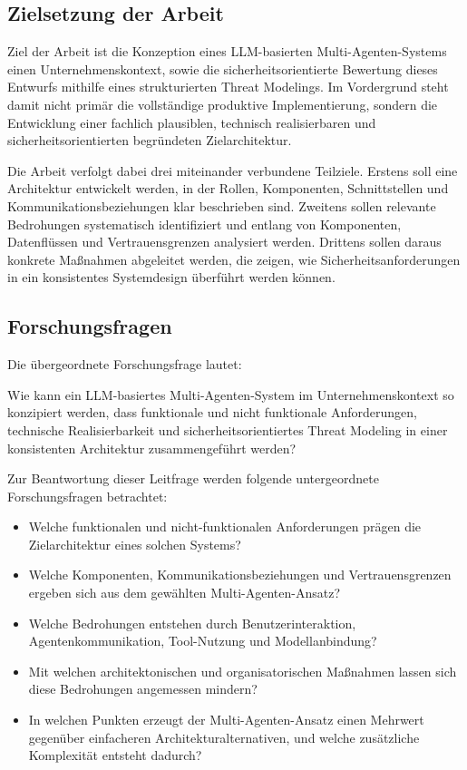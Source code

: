 \newpage

\subsection{Zielsetzung der Arbeit}

Ziel der Arbeit ist die Konzeption eines LLM-basierten Multi-Agenten-Systems einen Unternehmenskontext, sowie die sicherheitsorientierte Bewertung dieses Entwurfs mithilfe eines strukturierten Threat Modelings. Im Vordergrund steht damit nicht primär die vollständige produktive Implementierung, sondern die Entwicklung einer fachlich plausiblen, technisch realisierbaren und sicherheitsorientierten begründeten Zielarchitektur.

Die Arbeit verfolgt dabei drei miteinander verbundene Teilziele. Erstens soll eine Architektur entwickelt werden, in der Rollen, Komponenten, Schnittstellen und Kommunikationsbeziehungen klar beschrieben sind. Zweitens sollen relevante Bedrohungen systematisch identifiziert und entlang von Komponenten, Datenflüssen und Vertrauensgrenzen analysiert werden. Drittens sollen daraus konkrete Maßnahmen abgeleitet werden, die zeigen, wie Sicherheitsanforderungen in ein konsistentes Systemdesign überführt werden können. \cite{owasp_owasp_nodate, wong_adding_2000, krawiecka_extending_2025}

\subsection{Forschungsfragen}

Die übergeordnete Forschungsfrage lautet:

Wie kann ein LLM-basiertes Multi-Agenten-System im Unternehmenskontext so konzipiert werden, dass funktionale und nicht funktionale Anforderungen, technische Realisierbarkeit und sicherheitsorientiertes Threat Modeling in einer konsistenten Architektur zusammengeführt werden?

Zur Beantwortung dieser Leitfrage werden folgende untergeordnete Forschungsfragen betrachtet:

\begin{itemize}
	\item Welche funktionalen und nicht-funktionalen Anforderungen prägen die Zielarchitektur eines solchen Systems?
	\item Welche Komponenten, Kommunikationsbeziehungen und Vertrauensgrenzen ergeben sich aus dem gewählten Multi-Agenten-Ansatz?
	\item Welche Bedrohungen entstehen durch Benutzerinteraktion, Agentenkommunikation, Tool-Nutzung und Modellanbindung?
	\item Mit welchen architektonischen und organisatorischen Maßnahmen lassen sich diese Bedrohungen angemessen mindern?
	\item In welchen Punkten erzeugt der Multi-Agenten-Ansatz einen Mehrwert gegenüber einfacheren Architekturalternativen, und welche zusätzliche Komplexität entsteht dadurch?
\end{itemize}